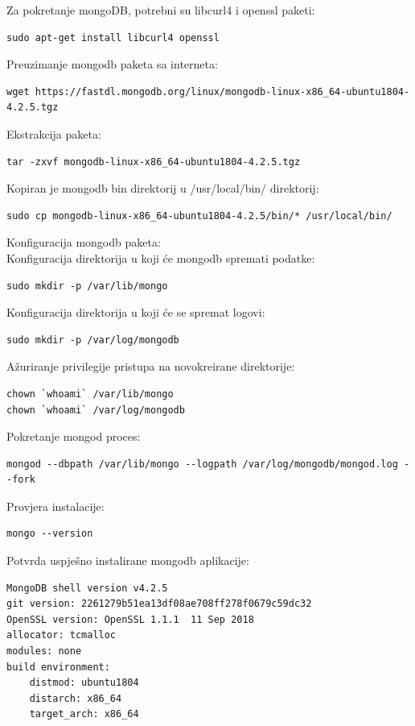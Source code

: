 \documentclass[12pt,vi]{mitthesis}
\begin{document}
\noindent
Za pokretanje mongoDB, potrebni su libcurl4 i openssl paketi:
\begin{lstlisting}[style=BashInputStyle]
sudo apt-get install libcurl4 openssl
\end{lstlisting}
Preuzimanje mongodb paketa sa interneta:
\begin{lstlisting}[style=BashInputStyle]
wget https://fastdl.mongodb.org/linux/mongodb-linux-x86_64-ubuntu1804-4.2.5.tgz
\end{lstlisting}
Ekstrakcija paketa:
\begin{lstlisting}[style=BashInputStyle]
tar -zxvf mongodb-linux-x86_64-ubuntu1804-4.2.5.tgz
\end{lstlisting}
Kopiran je mongodb bin direktorij u /usr/local/bin/ direktorij:
\begin{lstlisting}[style=BashInputStyle]
sudo cp mongodb-linux-x86_64-ubuntu1804-4.2.5/bin/* /usr/local/bin/
\end{lstlisting}
Konfiguracija mongodb paketa:\\
Konfiguracija direktorija u koji će mongodb spremati podatke:
\begin{lstlisting}[style=BashInputStyle]
sudo mkdir -p /var/lib/mongo
\end{lstlisting}
Konfiguracija direktorija u koji će se spremat logovi:
\begin{lstlisting}[style=BashInputStyle]
sudo mkdir -p /var/log/mongodb
\end{lstlisting}
Ažuriranje privilegije pristupa na novokreirane direktorije:
\begin{lstlisting}[style=BashInputStyle]
chown `whoami` /var/lib/mongo 
chown `whoami` /var/log/mongodb
\end{lstlisting}
Pokretanje mongod proces:
\begin{lstlisting}[style=BashInputStyle]
mongod --dbpath /var/lib/mongo --logpath /var/log/mongodb/mongod.log --fork
\end{lstlisting}
Provjera instalacije:
\begin{lstlisting}[style=BashInputStyle]
mongo --version
\end{lstlisting}
Potvrda uspješno instalirane mongodb aplikacije:
\begin{lstlisting}[style=BashInputStyle]
MongoDB shell version v4.2.5
git version: 2261279b51ea13df08ae708ff278f0679c59dc32
OpenSSL version: OpenSSL 1.1.1  11 Sep 2018
allocator: tcmalloc
modules: none
build environment:
    distmod: ubuntu1804
    distarch: x86_64
    target_arch: x86_64
\end{lstlisting}
\end{document}
